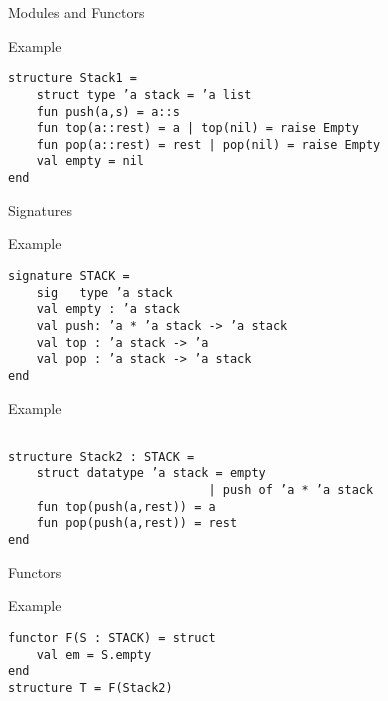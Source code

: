 \documentclass[presentation]{beamer}
\begin{document}
\begin{frame}[fragile]{Modules and Functors}
\begin{block}{Example}
\begin{verbatim}
structure Stack1 =
    struct type ’a stack = ’a list
    fun push(a,s) = a::s
    fun top(a::rest) = a | top(nil) = raise Empty
    fun pop(a::rest) = rest | pop(nil) = raise Empty
    val empty = nil
end
\end{verbatim}
\end{block}
\end{frame}

\begin{frame}[fragile]{Signatures}
  \begin{block}{Example}
\begin{verbatim}
signature STACK =
    sig   type ’a stack
    val empty : ’a stack
    val push: ’a * ’a stack -> ’a stack
    val top : ’a stack -> ’a
    val pop : ’a stack -> ’a stack
end
\end{verbatim}
  \end{block}
  \pause
  \begin{block}{Example}
\begin{verbatim}

structure Stack2 : STACK =
    struct datatype ’a stack = empty
                            | push of ’a * ’a stack
    fun top(push(a,rest)) = a
    fun pop(push(a,rest)) = rest
end
\end{verbatim}
  \end{block}
\end{frame}

\begin{frame}[fragile]{Functors}
  \begin{block}{Example}
\begin{verbatim}
functor F(S : STACK) = struct  
    val em = S.empty
end
structure T = F(Stack2)
\end{verbatim}
  \end{block}
\end{frame}
\end{document}
